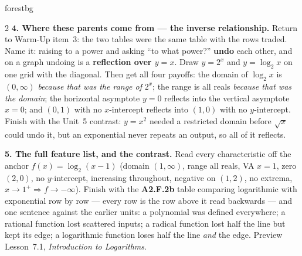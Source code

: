 \documentclass[10pt]{article}
\begin{document}
\begin{skillbox}[Lesson]{forestbg}
\begin{multicols}{2}
\textbf{4. Where these parents come from --- the inverse relationship.} Return to Warm-Up item~3: the
two tables were the same table with the rows traded. Name it: raising to a power and asking ``to what
power?'' \textbf{undo} each other, and on a graph undoing is a \textbf{reflection over $y=x$}. Draw
$y=2^x$ and $y=\log_2 x$ on one grid with the diagonal. Then get all four payoffs: the domain of
$\log_2 x$ is $(0,\infty)$ \emph{because that was the range of} $2^x$; the range is all reals
\emph{because that was the domain}; the horizontal asymptote $y=0$ reflects into the vertical
asymptote $x=0$; and $(0,1)$ with no $x$-intercept reflects into $(1,0)$ with no $y$-intercept. Finish
with the Unit~5 contrast: $y=x^2$ needed a restricted domain before $\sqrt{x}$ could undo it, but an
exponential never repeats an output, so all of it reflects.

\textbf{5. The full feature list, and the contrast.} Read every characteristic off the anchor
$f(x)=\log_2(x-1)$ (domain $(1,\infty)$, range all reals, VA $x=1$, zero $(2,0)$, no $y$-intercept,
increasing throughout, negative on $(1,2)$, no extrema, $x\to1^{+}\Rightarrow f\to-\infty$). Finish
with the \textbf{A2.F.2b} table comparing logarithmic with exponential row by row --- every row is the
row above it read backwards --- and one sentence against the earlier units: a polynomial was defined
everywhere; a rational function lost scattered inputs; a radical function lost half the line but kept
its edge; a logarithmic function loses half the line \emph{and} the edge. Preview Lesson~7.1,
\emph{Introduction to Logarithms}.
\end{multicols}
\end{skillbox}
\end{document}
